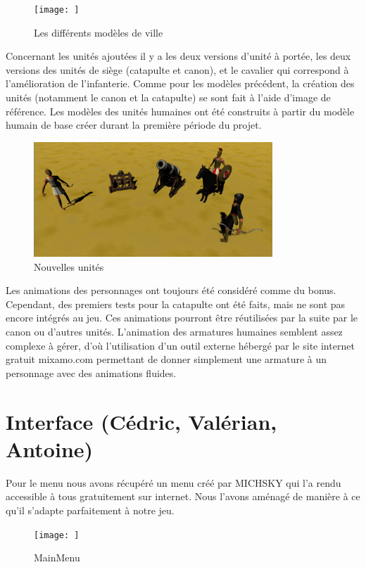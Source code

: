 \documentclass[12pt]{report}
\begin{document}
\begin{figure}[H]
    \centering
    \texttt{[image: ]}
    \caption{Les différents modèles de ville}
\end{figure}

Concernant les unités ajoutées il y a les deux versions d’unité à portée, les
deux versions des unités de siège (catapulte et canon), et le cavalier qui
correspond à l’amélioration de l’infanterie. Comme pour les modèles précédent,
la création des unités (notamment le canon et la catapulte) se sont fait à
l’aide d’image de référence. Les modèles des unités humaines ont été construits
à partir du modèle humain de base créer durant la première période du projet.

\begin{figure}[H]
    \centering
    \includegraphics[width=0.8\textwidth]{NewUnitsScreen}
    \caption{Nouvelles unités}
\end{figure}

Les animations des personnages ont toujours été considéré comme du bonus.
Cependant, des premiers tests pour la catapulte ont été faits, mais ne sont pas
encore intégrés au jeu. Ces animations pourront être réutilisées par la suite
par le canon ou d'autres unités. L'animation des armatures humaines semblent
assez complexe à gérer, d'où l'utilisation d'un outil externe hébergé par le
site internet gratuit mixamo.com permettant de donner simplement une armature à
un personnage avec des animations fluides.

\section{Interface (Cédric, Valérian, Antoine)}

Pour le menu nous avons récupéré un menu créé par MICHSKY qui l’a rendu
accessible à tous gratuitement sur internet. Nous l’avons aménagé de manière à
ce qu’il s’adapte parfaitement à notre jeu.

\begin{figure}[H]
    \centering
    \texttt{[image: ]}
    \caption{MainMenu}
\end{figure}
\end{document}
